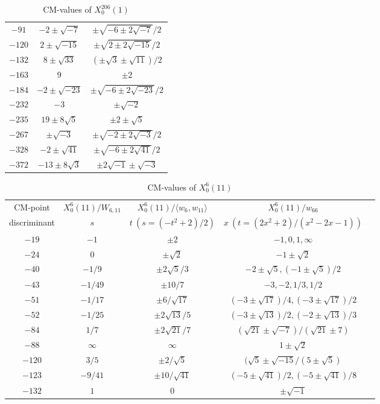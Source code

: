 \documentclass{amsart}
\theoremstyle{definition}
\begin{document}
\begin{appendices}
\begin{table}[htb]
\begin{tabular}{|c|c|c|}
${-91}$ & $-2\pm\sqrt{-7}$ & $\pm \sqrt{-6\pm 2\sqrt{-7}}/{2}$   \\ 

${-120}$ & $2\pm\sqrt{-15}$ & ${\pm \sqrt{2\pm 2\sqrt{-15}}%
}/{2}$ \\ 
${-132}$ & $8\pm\sqrt{33}$ & $(\pm\sqrt{3}\pm\sqrt{11})/{2}$  \\ 
${-163}$ & $9$ & $\pm 2$  \\ 
${-184}$ & $-2\pm\sqrt{-23}$ & $\pm \sqrt{-6\pm 2\sqrt{-23}%
}/{2}$ \\ 
${-232}$ & $-3$ & $\pm \sqrt{-2}$    \\ 
${-235}$ & $19\pm 8\sqrt{5}$ & $\pm 2\pm \sqrt{5}$  \\ 
${-267}$ & $\pm\sqrt{-3}$ & ${\pm \sqrt{-2\pm 2\sqrt{-3}}%
}/{2}$ \\ 
${-328}$ & $-2\pm\sqrt{41}$ & ${\pm \sqrt{-6\pm 2\sqrt{41}}%
}/{2}$  \\ 
${-372}$ & $-13\pm 8\sqrt{3}$ & $\pm 2\sqrt{-1}\pm\sqrt{-3}$  \\ \hline
\end{tabular}
\bigskip
\caption{CM-values of $X^{206}_0(1)$}
\end{table}

\renewcommand{\arraystretch}{1.5}
\tabcolsep=10pt                         
\begin{table}
\begin{tabular}{|c|c|c|c|c|}
\hline
CM-point& ${X_{0}^{6}(11)/W_{6,11}}$ & ${X_{0}^{6}(11)/\langle w_{6},w_{11}\rangle}$ & ${X_{0}^{6}(11)}/w_{66}$ \\ 
discriminant & $s$ & $t\ (s=(-t^2+2)/{2})$ & $x\ (t=(2x^2+2)/(x^2-2x-1))$  \\ \hline
${-19}$ & $-1$ & $\pm 2$ & $-1,0,1,\infty$  \\ 

${-24}$ & $0$ & $\pm \sqrt{2}$ & $- 1\pm \sqrt{2}$  \\ 

${-40}$ & $-{1}/{9}$ & $\pm 2\sqrt{5}/{3}$ & $-2\pm \sqrt{5},%
(-1\pm \sqrt{5})/{2}$  \\ 
${-43}$ & $-{1}/{49}$ & $\pm 10/{7}$ & $-3,-2,{1}/{3},%
{1}/{2}$  \\ 

${-51}$ & $-{1}/{17}$ & $\pm6/\sqrt{17}$ & $(-3\pm 
\sqrt{17})/{4},(-3\pm \sqrt{17})/{2}$ 
\\ 
${-52}$ & $-{1}/{25}$ & $\pm2 \sqrt{13}/{5}$ & $(-3\pm 
\sqrt{13})/{2},(-2\pm \sqrt{13})/{3}$  \\ 
${-84}$ & ${1}/{7}$ & $\pm 2\sqrt{21}/{7}$ & $(\sqrt{21}\pm 
\sqrt{-7})/(\sqrt{21}\pm 7)$  \\ 
${-88}$ & $\infty $ & $\infty $ & $1\pm\sqrt{2} $ \\ 
${-120}$ & ${3}/{5}$ & $\pm{ 2/\sqrt{5}}$ & $(\sqrt{5}%
\pm \sqrt{-15}/({5\pm \sqrt{5}})$ \\ 
${-123}$ & $-{9}/{41}$ & $\pm 10/\sqrt{41}$ & $
(-5\pm \sqrt{41})/{2},(-5\pm \sqrt{41})/{8}$  \\ 
${-132}$ & $1$ & $0$ & $\pm \sqrt{-1}$  \\ \hline
\end{tabular}
\bigskip
\caption{CM-values of $X^{6}_0(11)$}


\end{table}
\end{appendices}
\end{document}
